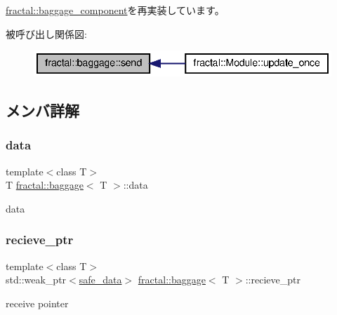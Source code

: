 \hyperlink{classfractal_1_1baggage__component_a8fdf9e534f892911e674de5a60eadf64}{fractal\+::baggage\+\_\+component}を再実装しています。

被呼び出し関係図\+:
\nopagebreak
\begin{figure}[H]
\begin{center}
\leavevmode
\includegraphics[width=336pt]{classfractal_1_1baggage_a12ef96c1b906369cfeeabdead61c257b_icgraph}
\end{center}
\end{figure}


\subsection{メンバ詳解}
\mbox{\label{classfractal_1_1baggage_a4ab1a1ce03c4f278087f62f7feac8cc3}} 
\subsubsection{\texorpdfstring{data}{data}}
{\footnotesize\ttfamily template$<$class T$>$ \\
T \hyperlink{classfractal_1_1baggage}{fractal\+::baggage}$<$ T $>$\+::data\hspace{0.3cm}{\ttfamily [private]}}



data 

\mbox{\label{classfractal_1_1baggage_ac6610690826b59751242686d488efe88}} 
\subsubsection{\texorpdfstring{recieve\+\_\+ptr}{recieve\_ptr}}
{\footnotesize\ttfamily template$<$class T$>$ \\
std\+::weak\+\_\+ptr$<$\hyperlink{structfractal_1_1baggage_1_1safe__data}{safe\+\_\+data}$>$ \hyperlink{classfractal_1_1baggage}{fractal\+::baggage}$<$ T $>$\+::recieve\+\_\+ptr\hspace{0.3cm}{\ttfamily [private]}}



receive pointer 

